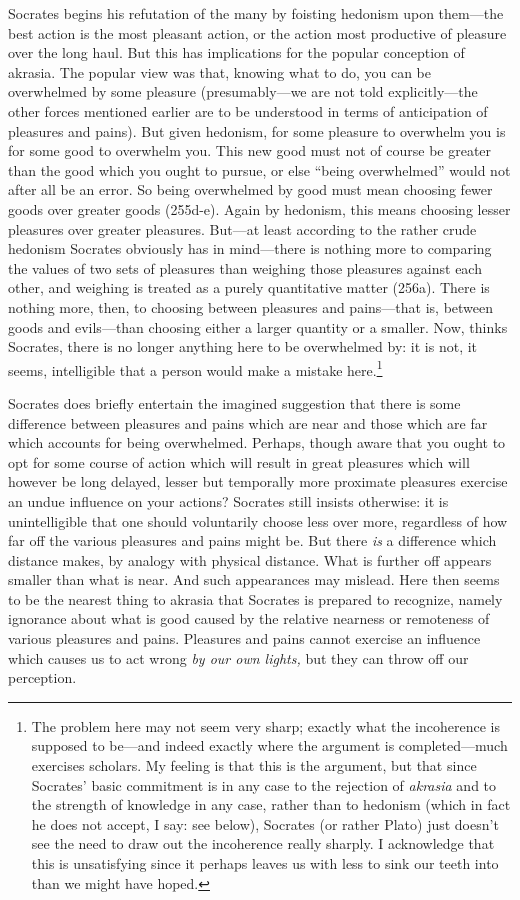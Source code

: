\documentclass[11pt]{amsart}
\begin{document}
Socrates begins his refutation of the many by foisting hedonism upon them---the best action is the most pleasant action, or the action most productive of pleasure over the long haul. But this has implications for the popular conception of akrasia. The popular view was that, knowing what to do, you can be overwhelmed by some pleasure (presumably---we are not told explicitly---the other forces mentioned earlier are to be understood in terms of anticipation of pleasures and pains). But given hedonism, for some pleasure to overwhelm you is for some good to overwhelm you. This new good must not of course be greater than the good which you ought to pursue, or else ``being overwhelmed'' would not after all be an error. So being overwhelmed by good must mean choosing fewer goods over greater goods (255d-e). Again by hedonism, this means choosing lesser pleasures over greater pleasures. But---at least according to the rather crude hedonism Socrates obviously has in mind---there is nothing more to comparing the values of two sets of pleasures than weighing those pleasures against each other, and weighing is treated as a purely quantitative matter (256a). There is nothing more, then, to choosing between pleasures and pains---that is, between goods and evils---than choosing either a larger quantity or a smaller. Now, thinks Socrates, there is no longer anything here to be overwhelmed by: it is not, it seems, intelligible that a person would make a mistake here.\footnote{The problem here may not seem very sharp; exactly what the incoherence is supposed to be---and indeed exactly where the argument is completed---much exercises scholars. My feeling is that this is the argument, but that since Socrates' basic commitment is in any case to the rejection of \emph{akrasia} and to the strength of knowledge in any case, rather than to hedonism (which in fact he does not accept, I say: see below), Socrates (or rather Plato) just doesn't see the need to draw out the incoherence really sharply. I acknowledge that this is unsatisfying since it perhaps leaves us with less to sink our teeth into than we might have hoped.}

Socrates does briefly entertain the imagined suggestion that there is some difference between pleasures and pains which are near and those which are far which accounts for being overwhelmed. Perhaps, though aware that you ought to opt for some course of action which will result in great pleasures which will however be long delayed, lesser but temporally more proximate pleasures exercise an undue influence on your actions? Socrates still insists otherwise: it is unintelligible that one should voluntarily choose less over more, regardless of how far off the various pleasures and pains might be. But there \emph{is} a difference which distance makes, by analogy with physical distance. What is further off appears smaller than what is near. And such appearances may mislead. Here then seems to be the nearest thing to akrasia that Socrates is prepared to recognize, namely ignorance about what is good caused by the relative nearness or remoteness of various pleasures and pains. Pleasures and pains cannot exercise an influence which causes us to act wrong \emph{by our own lights,} but they can throw off our perception.
\end{document}
